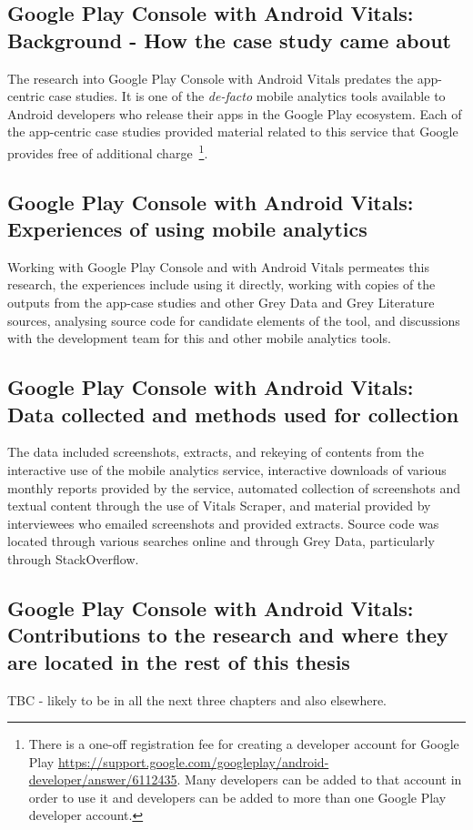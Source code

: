 \subsection{Google Play Console with Android Vitals: Background - How the case study came about}
The research into Google Play Console with Android Vitals predates the app-centric case studies. It is one of the \emph{de-facto} mobile analytics tools available to Android developers who release their apps in the Google Play ecosystem. Each of the app-centric case studies provided material related to this service that Google provides free of additional charge~\footnote{There is a one-off registration fee for creating a developer account for Google Play \url{https://support.google.com/googleplay/android-developer/answer/6112435}. Many developers can be added to that account in order to use it and developers can be added to more than one Google Play developer account.}.

\subsection{Google Play Console with Android Vitals: Experiences of using mobile analytics}
Working with Google Play Console and with Android Vitals permeates this research, the experiences include using it directly, working with copies of the outputs from the app-case studies and other Grey Data and Grey Literature sources, analysing source code for candidate elements of the tool, and discussions with the development team for this and other mobile analytics tools.

\subsection{Google Play Console with Android Vitals: Data collected and methods used for collection}
The data included screenshots, extracts, and rekeying of contents from the interactive use of the mobile analytics service, interactive downloads of various monthly reports provided by the service, automated collection of screenshots and textual content through the use of Vitals Scraper, and material provided by interviewees who emailed screenshots and provided extracts. Source code was located through various searches online and through Grey Data, particularly through StackOverflow. 


\subsection{Google Play Console with Android Vitals: Contributions to the research and where they are located in the rest of this thesis}
TBC - likely to be in all the next three chapters and also elsewhere.

